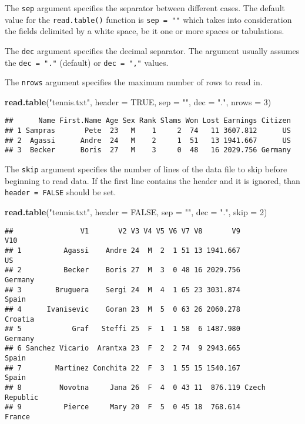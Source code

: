 \documentclass[]{book}
\newenvironment{Shaded}{\begin{snugshade}}{\end{snugshade}}
\newcommand{\KeywordTok}[1]{\textcolor[rgb]{0.13,0.29,0.53}{\textbf{{#1}}}}
\newcommand{\DataTypeTok}[1]{\textcolor[rgb]{0.13,0.29,0.53}{{#1}}}
\newcommand{\DecValTok}[1]{\textcolor[rgb]{0.00,0.00,0.81}{{#1}}}
\newcommand{\StringTok}[1]{\textcolor[rgb]{0.31,0.60,0.02}{{#1}}}
\newcommand{\OtherTok}[1]{\textcolor[rgb]{0.56,0.35,0.01}{{#1}}}
\newcommand{\NormalTok}[1]{{#1}}
\begin{document}
The \texttt{sep} argument specifies the separator between different
cases. The default value for the \texttt{read.table()} function is
\texttt{sep\ =\ ""} which takes into consideration the fields delimited
by a white space, be it one or more spaces or tabulations.

The \texttt{dec} argument specifies the decimal separator. The argument
usually assumes the \texttt{dec\ =\ "."} (default) or
\texttt{dec\ =\ ","} values.

The \texttt{nrows} argument specifies the maximum number of rows to read
in.

\begin{Shaded}
\begin{Highlighting}[]
\KeywordTok{read.table}\NormalTok{(}\StringTok{"tennis.txt"}\NormalTok{, }\DataTypeTok{header =} \OtherTok{TRUE}\NormalTok{, }\DataTypeTok{sep =} \StringTok{""}\NormalTok{, }\DataTypeTok{dec =} \StringTok{"."}\NormalTok{, }\DataTypeTok{nrows =} \DecValTok{3}\NormalTok{)}
\end{Highlighting}
\end{Shaded}

\begin{verbatim}
##      Name First.Name Age Sex Rank Slams Won Lost Earnings Citizen
## 1 Sampras       Pete  23   M    1     2  74   11 3607.812      US
## 2  Agassi      Andre  24   M    2     1  51   13 1941.667      US
## 3  Becker      Boris  27   M    3     0  48   16 2029.756 Germany
\end{verbatim}

The \texttt{skip} argument specifies the number of lines of the data
file to skip before beginning to read data. If the first line contains
the header and it is ignored, than \texttt{header\ =\ FALSE} should be
set.

\begin{Shaded}
\begin{Highlighting}[]
\KeywordTok{read.table}\NormalTok{(}\StringTok{"tennis.txt"}\NormalTok{, }\DataTypeTok{header =} \OtherTok{FALSE}\NormalTok{, }\DataTypeTok{sep =} \StringTok{""}\NormalTok{, }\DataTypeTok{dec =} \StringTok{"."}\NormalTok{, }\DataTypeTok{skip =} \DecValTok{2}\NormalTok{)}
\end{Highlighting}
\end{Shaded}

\begin{verbatim}
##                V1       V2 V3 V4 V5 V6 V7 V8       V9            V10
## 1          Agassi    Andre 24  M  2  1 51 13 1941.667             US
## 2          Becker    Boris 27  M  3  0 48 16 2029.756        Germany
## 3        Bruguera    Sergi 24  M  4  1 65 23 3031.874          Spain
## 4      Ivanisevic    Goran 23  M  5  0 63 26 2060.278        Croatia
## 5            Graf   Steffi 25  F  1  1 58  6 1487.980        Germany
## 6 Sanchez Vicario  Arantxa 23  F  2  2 74  9 2943.665          Spain
## 7        Martinez Conchita 22  F  3  1 55 15 1540.167          Spain
## 8         Novotna     Jana 26  F  4  0 43 11  876.119 Czech Republic
## 9          Pierce     Mary 20  F  5  0 45 18  768.614         France
\end{verbatim}
\end{document}
